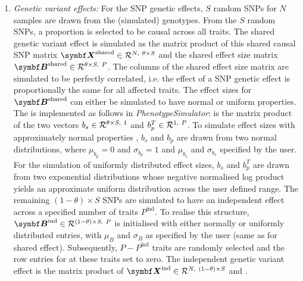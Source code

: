 \begin{enumerate}
\item \textit{Genetic variant effects:} For the SNP genetic effects, \(S\) random SNPs for \(N\) samples are drawn from the (simulated) genotypes. From the \(S\) random SNPs, a proportion \tmat{\theta} is selected to be causal across all traits. The shared genetic variant effect is simulated as the matrix product of this shared causal SNP matrix \(\matsup{X}{shared}\inR N {\theta \times S}\) and the shared effect size matrix \(\matsup{B}{shared} \inR {\theta  \times S} P\). The columns of the shared effect size matrix are simulated to be perfectly correlated, i.e. the effect of a SNP genetic effect is proportionally the same for all affected traits. The effect sizes for \(\matsup{B}{shared}\) can either be simulated to have normal or uniform properties. The is implemented as follows in \textit{PhenotypeSimulator}:
 is the matrix product of the two vectors \(b_s \in \mathcal{R}^{\theta  \times S,~1}\) and \(b_p^T \in \mathcal{R}^{1,~P}\). To simulate effect sizes with approximately normal properties \citep[Eq 31-33]{Oliveira2012}, \(b_s\) and \(b_p\) are drawn from two normal distributions, where \(\mu_{b_p}=0\) and \(\sigma_{b_p}=1\) and \(\mu_{b_s}\) and \(\sigma_{b_s}\) specified by the user. For the simulation of uniformly distributed effect sizes,  \(b_s \) and \(b_p^T\) are drawn from two exponential distributions whose negative normalised log product yields an approximate uniform distribution \citep{Song2005} across the user defined range. 
The remaining \((1- \theta ) \times S\) SNPs are simulated to have an independent effect across a specified number of traits \(P^{\text{ind}}\). To realise this structure, \(\matsup{B}{ind} \inR {(1-\theta) \times S} P\) is initialised with either normally or uniformly distributed entries, with \(\mu_{B}\) and \(\sigma_{B}\) as specified by the user (same as for shared effect). Subsequently, \(P - P^{\text{ind}}\) traits are randomly selected and the row entries for  at these traits set to zero. The independent genetic variant effect is the matrix product of \(\matsup{X}{ind} \inR N {(1 - \theta)  \times S}\) and .



\end{enumerate}
